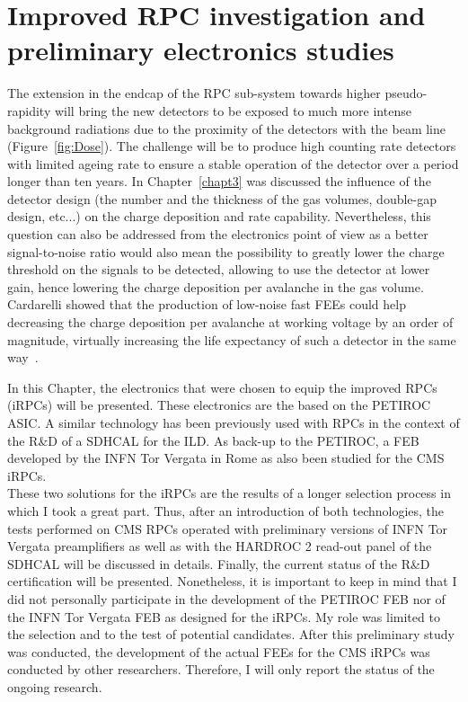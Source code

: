 \renewcommand\evenpagerightmark{{\scshape\small Chapter 6}}
\renewcommand\oddpageleftmark{{\scshape\small Improved RPC investigation and preliminary electronics studies}}

\renewcommand{\bibname}{References}

\hyphenation{}

\chapter[Improved RPC investigation and preliminary electronics studies]%
{Improved RPC investigation and preliminary electronics studies}
\label{chapt6}

	The extension in the endcap of the RPC sub-system towards higher pseudo-rapidity will bring the new detectors to be exposed to much more intense background radiations due to the proximity of the detectors with the beam line (Figure~\ref{fig:Dose}). The challenge will be to produce high counting rate detectors with limited ageing rate to ensure a stable operation of the detector over a period longer than ten years. In Chapter~\ref{chapt3} was discussed the influence of the detector design (the number and the thickness of the gas volumes, double-gap design, etc...) on the charge deposition and rate capability. Nevertheless, this question can also be addressed from the electronics point of view as a better signal-to-noise ratio would also mean the possibility to greatly lower the charge threshold on the signals to be detected, allowing to use the detector at lower gain, hence lowering the charge deposition per avalanche in the gas volume. Cardarelli showed that the production of low-noise fast FEEs could help decreasing the charge deposition per avalanche at working voltage by an order of magnitude, virtually increasing the life expectancy of such a detector in the same way~\cite{CARDARELLI2012}.
	
	In this Chapter, the electronics that were chosen to equip the improved RPCs (iRPCs) will be presented. These electronics are the based on the PETIROC ASIC. A similar technology has been previously used with RPCs in the context of the R\&D of a \acf{SDHCAL} for the \acf{ILD}. As back-up to the PETIROC, a FEB developed by the INFN Tor Vergata in Rome as also been studied for the CMS iRPCs.\\
	These two solutions for the iRPCs are the results of a longer selection process in which I took a great part. Thus, after an introduction of both technologies, the tests performed on CMS RPCs operated with preliminary versions of INFN Tor Vergata preamplifiers as well as with the HARDROC 2 read-out panel of the SDHCAL will be discussed in details. Finally, the current status of the R\&D certification will be presented. Nonetheless, it is important to keep in mind that I did not personally participate in the development of the PETIROC FEB nor of the INFN Tor Vergata FEB as designed for the iRPCs. My role was limited to the selection and to the test of potential candidates. After this preliminary study was conducted, the development of the actual FEEs for the CMS iRPCs was conducted by other researchers. Therefore, I will only report the status of the ongoing research.


